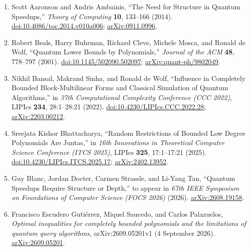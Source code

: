 \begin{enumerate}[label={},leftmargin=4.8em,labelsep=0.5em]
  \footnotesize
  \item[\textup{[AA14]}]\label{ref:a11f-aa}
  Scott Aaronson and Andris Ambainis, ``The Need for Structure in Quantum
Speedups,'' \emph{Theory of Computing} \textbf{10}, 133--166 (2014).
\href{https://doi.org/10.4086/toc.2014.v010a006}{doi:10.4086/toc.2014.v010a006};
\href{https://arxiv.org/abs/0911.0996}{arXiv:0911.0996}.

  \item[\textup{[BBCMW01]}]\label{ref:a11f-bbc}
  Robert Beals, Harry Buhrman, Richard Cleve, Michele Mosca, and Ronald de
Wolf, ``Quantum Lower Bounds by Polynomials,'' \emph{Journal of the ACM}
\textbf{48}, 778--797 (2001).
\href{https://doi.org/10.1145/502090.502097}{doi:10.1145/502090.502097};
\href{https://arxiv.org/abs/quant-ph/9802049}{arXiv:quant-ph/9802049}.

  \item[\textup{[BSW22]}]\label{ref:a11f-bsw}
  Nikhil Bansal, Makrand Sinha, and Ronald de Wolf, ``Influence in
Completely Bounded Block-Multilinear Forms and Classical Simulation of
Quantum Algorithms,'' in \emph{37th Computational Complexity Conference
(CCC 2022)}, LIPIcs \textbf{234}, 28:1--28:21 (2022).
\href{https://doi.org/10.4230/LIPIcs.CCC.2022.28}{doi:10.4230/LIPIcs.CCC.2022.28};
\href{https://arxiv.org/abs/2203.00212}{arXiv:2203.00212}.

  \item[\textup{[Bhat25]}]\label{ref:a11f-bhatt}
  Sreejata Kishor Bhattacharya, ``Random Restrictions of Bounded Low Degree
Polynomials Are Juntas,'' in \emph{16th Innovations in Theoretical Computer
Science Conference (ITCS 2025)}, LIPIcs \textbf{325}, 17:1--17:21 (2025).
\href{https://doi.org/10.4230/LIPIcs.ITCS.2025.17}{doi:10.4230/LIPIcs.ITCS.2025.17};
\href{https://arxiv.org/abs/2402.13952}{arXiv:2402.13952}.

  \item[\textup{[BDST26]}]\label{ref:a11f-bdst}
  Guy Blanc, Jordan Docter, Carmen Strassle, and Li-Yang Tan, ``Quantum
Speedups Require Structure or Depth,'' to appear in \emph{67th IEEE Symposium
on Foundations of Computer Science (FOCS 2026)} (2026).
\href{https://arxiv.org/abs/2608.19158}{arXiv:2608.19158}.

  \item[\textup{[ESP26]}]\label{ref:a11f-esp}
  Francisco Escudero Guti\'errez, Miquel Saucedo, and Carlos Palazuelos, \emph{Optimal inequalities for completely bounded polynomials and the limitations of quantum query algorithms}, arXiv:2609.05201v1 (4 September 2026). \href{https://arxiv.org/abs/2609.05201}{arXiv:2609.05201}.
\end{enumerate}

